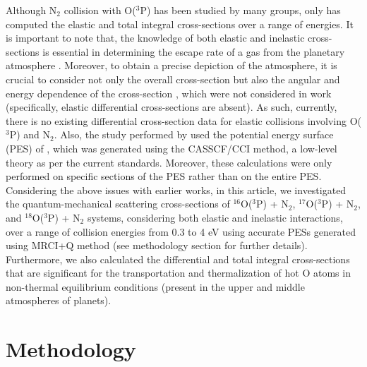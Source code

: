 \documentclass[fleqn,usenatbib]{mnras}
\begin{document}
Although N$_2$ collision with O($^3$P) has been studied by many groups, only \cite{https://doi.org/10.1029/98JA02198} has computed the elastic and total integral cross-sections over a range of energies. It is important to note that, the knowledge of both elastic and inelastic cross-sections is essential in determining the escape rate of a gas from the planetary atmosphere \citep{https://doi.org/10.1002/2016JA023525}. Moreover, to obtain a precise depiction of the atmosphere, it is crucial to consider not only the overall cross-section but also the angular and energy dependence of the cross-section \citep{10.1063/1.1734304,10.1063/1.452944}, which were not considered in \cite{https://doi.org/10.1029/98JA02198} work (specifically, elastic differential cross-sections are absent). As such, currently, there is no existing differential cross-section data for elastic collisions involving O($^3$P) and N$_2$. Also, the study  performed by \cite{https://doi.org/10.1029/98JA02198} used the potential energy surface (PES) of \cite{gilibert1992dynamics}, which was generated using the CASSCF/CCI method, a low-level theory as per the current standards. Moreover, these calculations were only performed on specific sections of the PES rather than on the entire PES. Considering the above issues with earlier works, in this article, we investigated the quantum-mechanical scattering cross-sections of $^{16}$O($^3$P) + N$_2$, $^{17}$O($^3$P) + N$_2$, and $^{18}$O($^3$P) + N$_2$ systems, considering both elastic and inelastic interactions, over a range of collision energies from 0.3 to 4 eV using accurate PESs generated using MRCI+Q method (see methodology section for further details). Furthermore, we also calculated the differential and total integral cross-sections that are significant for the transportation and thermalization of hot O atoms in non-thermal equilibrium conditions (present in the upper and middle atmospheres of planets).


\section{Methodology}
\end{document}
